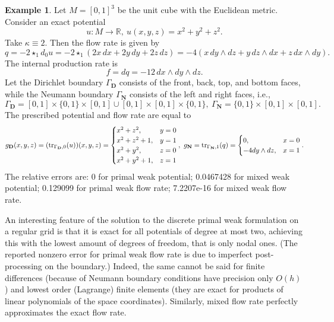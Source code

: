 \documentclass{elsarticle}
\theoremstyle{definition}
\newtheorem{example}[theorem]{Example}
\newcommand{\tr}{\mathop{\rm tr}\nolimits}
\newcommand{\R}{\mathbb{R}}
\newcommand{\Dirichlet}{\mathbf{D}}
\newcommand{\Neumann}{\mathbf{N}}
\begin{document}
\begin{example}
  Let $M = [0, 1]^3$ be the unit cube with the Euclidean metric.
  Consider an exact potential
  \begin{equation}
    u \colon M \to \R,\ u(x, y, z) = x^2 + y^2 + z^2.
  \end{equation}
  Take $\kappa \equiv 2$.
  Then the flow rate is given by
  \begin{equation}
    q = -2 \star_1 d_0 u
    = -2 \star_1(2 x\, d x + 2 y\, d y + 2 z\, d z)
    = -4(x\, d y \wedge d z + y\, d z \wedge d x + z\, d x \wedge d y).
  \end{equation}
  The internal production rate is
  \begin{equation}
    f = d q = -12\, d x \wedge dy \wedge d z.
  \end{equation}
  Let the Dirichlet boundary $\Gamma_\Dirichlet$ consists of the front, back, top, and bottom faces, while the Neumann boundary $\Gamma_\Neumann$ consists of the left and right faces, i.e.,
  \begin{equation}
    \Gamma_\Dirichlet = [0, 1] \times \{0, 1\} \times [0, 1] \cup [0, 1] \times [0, 1] \times \{0, 1\},\ \Gamma_\Neumann = \{0, 1\} \times [0, 1] \times [0, 1].
  \end{equation}
  The prescribed potential and flow rate are equal to
  \begin{equation}
    g_\Dirichlet(x, y, z)
    = (\tr_{\Gamma_\Dirichlet, 0}(u))(x, y, z)
    =
    \begin{cases}
      x^2 + z^2, & y = 0 \\
      x^2 + z^2 + 1, & y = 1 \\
      x^2 + y^2, & z = 0 \\
      x^2 + y^2 + 1, & z = 1
    \end{cases},\
    g_\Neumann = \tr_{\Gamma_\Neumann, 1}(q) =
    \begin{cases}
      0, & x = 0 \\
      -4 d y \wedge d z, & x = 1
    \end{cases}.
  \end{equation}
  The relative errors are:
  0
   for primal weak potential;
  0.0467428
   for mixed weak potential;
  0.129099
   for primal weak flow rate;
  7.2207e-16
   for mixed weak flow rate.

  An interesting feature of the solution to the discrete primal weak formulation on a regular grid is that it is exact for all potentials of degree at most two, achieving this with the lowest amount of degrees of freedom, that is only nodal ones.
  (The reported nonzero error for primal weak flow rate is due to imperfect post-processing on the boundary.)
  Indeed, the same cannot be said for finite differences (because of Neumann boundary conditions have precision only $O(h)$) and lowest order (Lagrange) finite elements (they are exact for products of linear polynomials of the space coordinates).
  Similarly, mixed flow rate perfectly approximates the exact flow rate.
\end{example}
\end{document}
